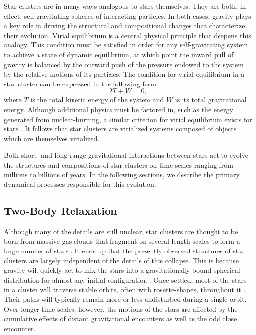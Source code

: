 Star clusters are
in many ways analogous to stars themselves.  They are both, in
effect, self-gravitating spheres of interacting particles.  In both
cases, gravity 
plays a key role in driving the structural and compositional
changes that characterize their evolution.  Virial equilibrium is a central
physical principle that deepens this analogy.  This condition must be
satisfied in order for any self-gravitating system to achieve a 
state of dynamic equilibrium, at which point the inward pull of
gravity is balanced by the outward push of the pressure endowed to the
system by the relative motions of its particles.  The condition for
virial equilibrium in a star cluster can be expressed in the following form:
\begin{equation}
\label{eqn:virial}
2T + W = 0,
\end{equation}
where $T$ is the total kinetic energy of the system and $W$ is its total
gravitational energy.  Although additional physics must be factored
in, such as the energy generated from nuclear-burning, a similar
criterion for virial equilibrium exists for stars
\citep[e.g.][]{chandrasekhar39}.  It follows that
star clusters are virialized 
systems composed of objects which are themselves virialized.    

Both short- and long-range gravitational interactions between stars
act to evolve the structures and compositions of star clusters on
time-scales ranging from millions to billions of years.  In the
following sections, we describe the primary dynamical processes
responsible for this evolution.

\subsection{Two-Body Relaxation} \label{two-body}

Although many of the details are still unclear, star clusters are
thought to be born 
from massive gas clouds that fragment on several length
scales to form a large number of stars \citep[e.g.][]{lada95,
  mckee07}.  It ends up
that the presently observed structures of star clusters are largely
independent of the details of this collapse.  This is because
gravity will quickly act to mix the stars into a gravitationally-bound
spherical distribution for almost any initial configuration
\citep{heggie03}.  Once settled, 
most of the stars in a cluster will traverse stable orbits, often with
rosette-shapes, throughout it \citep{heggie03}.  
Their paths will typically remain more or less undisturbed during a 
single orbit.  
Over longer time-scales, however, the motions of the 
stars are affected by the cumulative effects of distant gravitational
encounters as well as the odd close encounter.

